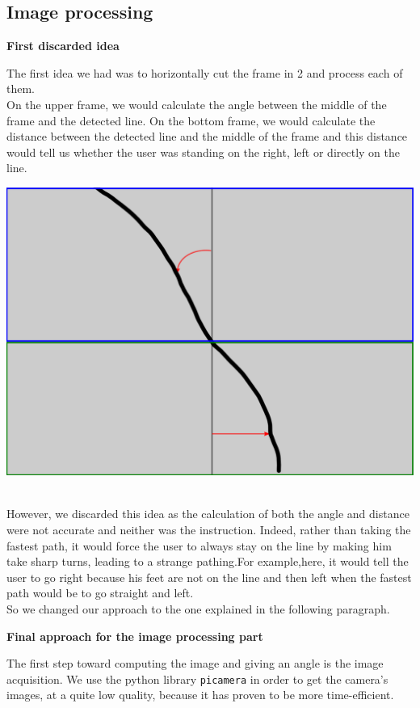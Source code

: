 \documentclass{rapport}
\begin{document}
\subsection{Image processing}
\vspace{3mm}
\begin{flushleft}
    \textbf{\large{First discarded idea}}
\end{flushleft}
The first idea we had was to horizontally cut the frame in 2 and process each of them.\\On the upper frame, we would calculate the angle between the middle of the frame and the detected line. On the bottom frame, we would calculate the distance between the detected line and the middle of the frame and this distance would tell us whether the user was standing on the right, left or directly on the line.
\vspace{4mm}
\begin{center}
    \includegraphics[width=0.4\linewidth]{ligne_decoupe.png}
\end{center}
\\ However, we discarded this idea as the calculation of both the angle and distance were not accurate and neither was the instruction. Indeed, rather than taking the fastest path, it would force the user to always stay on the line by making him take sharp turns, leading to a strange pathing.For example,here, it would tell the user to go right because his feet are not on the line and then left when the fastest path would be to go straight and left.\\
So we changed our approach to the one explained in the following paragraph.
\newpage
\begin{flushleft}
    \textbf{\large{Final approach for the image processing part}}
\end{flushleft}
The first step toward computing the image and giving an angle is the image acquisition. We use the python library \verb|picamera| in order to get the camera's images, at a quite low quality, because it has proven to be more time-efficient.\\
\end{document}

